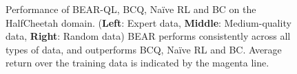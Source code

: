 \documentclass{article}
\begin{document}
\begin{figure}
\begin{subfigure}[t]{0.23\textwidth}
    \end{subfigure}
    \caption{ \footnotesize Performance of BEAR-QL, BCQ, Na\"ive RL and BC on the HalfCheetah domain. (\textbf{Left}: Expert data, \textbf{Middle}: Medium-quality data, \textbf{Right}: Random data) BEAR performs consistently across all types of data, and outperforms BCQ, Na\"ive RL and BC. Average return over the training data is indicated by the magenta line.}
    \label{fig:mediocre}
    \vspace{-0.1in}
\end{figure}

\clearpage


\end{document}
